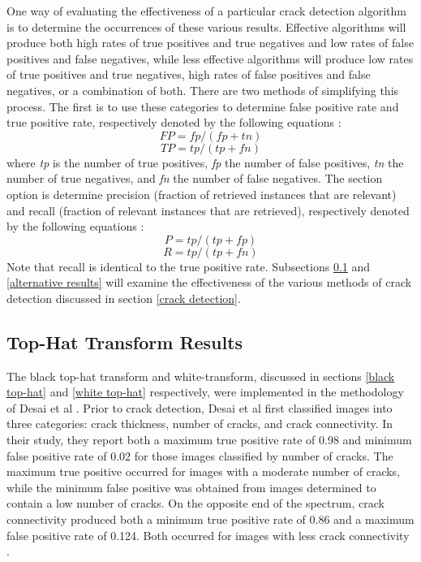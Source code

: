 \documentclass{sig-alternate}
\begin{document}
One way of evaluating the effectiveness of a particular crack detection algorithm is to determine the occurrences of these various results. Effective algorithms will produce both high rates of true positives and true negatives and low rates of false positives and false negatives, while less effective algorithms will produce low rates of true positives and true negatives, high rates of false positives and false negatives, or a combination of both. There are two methods of simplifying this process. The first is to use these categories to determine false positive rate and true positive rate, respectively denoted by the following equations \cite{Statistics:2013}:
\begin{equation*}
FP = fp / (fp + tn)
\end{equation*}
\begin{equation*}
TP = tp / (tp + fn)
\end{equation*}
where \textit{tp} is the number of true positives, \textit{fp} the number of false positives, \textit{tn} the number of true negatives, and \textit{fn} the number of false negatives. The section option is determine precision (fraction of retrieved instances that are relevant) and recall (fraction of relevant instances that are retrieved), respectively denoted by the following equations \cite{Theran:2013}:
\begin{equation*}
P = tp / (tp + fp)
\end{equation*}
\begin{equation*}
R = tp / (tp + fn)
\end{equation*}
Note that recall is identical to the true positive rate. Subsections \ref{top-hat results} and \ref{alternative results} will examine the effectiveness of the various methods of crack detection discussed in section \ref{crack detection}.

\subsection{Top-Hat Transform Results}\label{top-hat results}
The black top-hat transform and white-transform, discussed in sections \ref{black top-hat} and \ref{white top-hat} respectively, were implemented in the methodology of Desai et al \cite{Statistics:2013}. Prior to crack detection, Desai et al first classified images into three categories: crack thickness, number of cracks, and crack connectivity. In their study, they report both a maximum true positive rate of 0.98 and minimum false positive rate of 0.02 for those images classified by number of cracks. The maximum true positive occurred for images with a moderate number of cracks, while the minimum false positive was obtained from images determined to contain a low number of cracks. On the opposite end of the spectrum, crack connectivity produced both a minimum true positive rate of 0.86 and a maximum false positive rate of 0.124. Both occurred for images with less crack connectivity \cite{Statistics:2013}.
\end{document}
